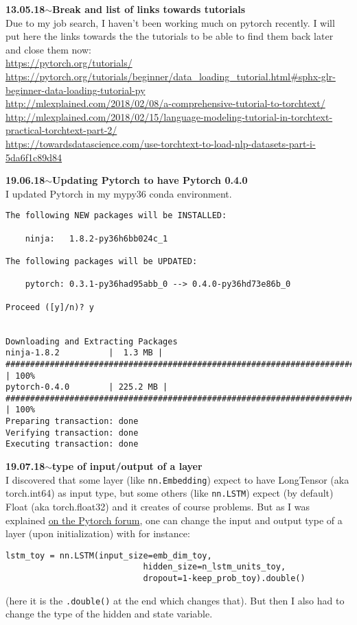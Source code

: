 \documentclass[11pt,a4paper]{article}
\newenvironment{loggentry}[2]%
{\noindent\textbf{#1}\hspace{1cm}$\mathbf{\sim}$\text{ }\textbf{#2}\\}{\vspace{0.5cm}}
\begin{document}
\begin{loggentry}{13.05.18}{Break and list of links towards tutorials}
Due to my job search, I haven't been working much on pytorch recently. I will put here the links towards the the tutorials to be able to find them back later and close them now:\\
\url{https://pytorch.org/tutorials/}\\
\url{https://pytorch.org/tutorials/beginner/data_loading_tutorial.html#sphx-glr-beginner-data-loading-tutorial-py}\\
\url{http://mlexplained.com/2018/02/08/a-comprehensive-tutorial-to-torchtext/}\\
\url{http://mlexplained.com/2018/02/15/language-modeling-tutorial-in-torchtext-practical-torchtext-part-2/}\\
\url{https://towardsdatascience.com/use-torchtext-to-load-nlp-datasets-part-i-5da6f1c89d84}\\
\end{loggentry}

\begin{loggentry}{19.06.18}{Updating Pytorch to have Pytorch 0.4.0}
I updated Pytorch in my mypy36 conda environment.
\begin{verbatim}
The following NEW packages will be INSTALLED:

    ninja:   1.8.2-py36h6bb024c_1

The following packages will be UPDATED:

    pytorch: 0.3.1-py36had95abb_0 --> 0.4.0-py36hd73e86b_0

Proceed ([y]/n)? y


Downloading and Extracting Packages
ninja-1.8.2          |  1.3 MB | ######################################################################## | 100% 
pytorch-0.4.0        | 225.2 MB | ####################################################################### | 100% 
Preparing transaction: done
Verifying transaction: done
Executing transaction: done

\end{verbatim}
\end{loggentry}

\begin{loggentry}{19.07.18}{type of input/output of a layer}
I discovered that some layer (like \texttt{nn.Embedding}) expect to have LongTensor (aka torch.int64) as input type, but some others (like \texttt{nn.LSTM}) expect (by default) Float (aka torch.float32) and it creates of course problems. But as I was explained \href{https://discuss.pytorch.org/t/why-does-nn-embedding-layers-expect-longtensor-type-input-tensors/21376/2}{on the Pytorch forum}, one can change the input and output type of a layer (upon initialization) with for instance:
\begin{verbatim}
lstm_toy = nn.LSTM(input_size=emb_dim_toy,
                            hidden_size=n_lstm_units_toy,
                            dropout=1-keep_prob_toy).double()
\end{verbatim}
(here it is the \texttt{.double()} at the end which changes that). But then I also had to change the type of the hidden and state variable.
\end{loggentry}
\end{document}
